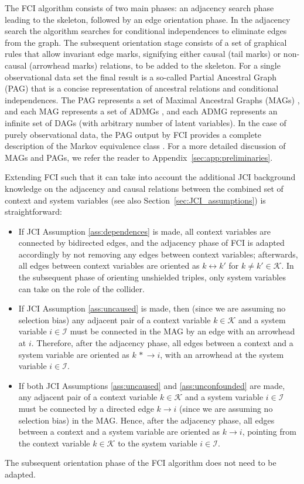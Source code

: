 \documentclass[twoside,11pt]{article}
\newcommand\C[1]{\mathcal{#1}}
\newcommand{\oto}{\leftrightarrow}
\begin{document}
The FCI algorithm consists of two main phases: an adjacency search phase leading to the skeleton, followed by an edge orientation phase. In the adjacency search the algorithm searches for conditional independences to eliminate edges from the graph. The subsequent orientation stage consists of a set of graphical rules that allow invariant edge marks, signifying either causal (tail marks) or non-causal (arrowhead marks) relations, to be added to the skeleton. For a single observational data set the final result is a so-called Partial Ancestral Graph (PAG) that is a concise representation of ancestral relations and conditional independences. The PAG represents a set of Maximal Ancestral Graphs (MAGs) \citep{RichardsonSpirtes02}, and each MAG represents a set of ADMGs \citep{triantafillou2015constraint}, and each ADMG represents an infinite set of DAGs (with arbitrary number of latent variables). In the case of purely observational data, the PAG output by FCI provides a complete description of the Markov equivalence class \citep{Zhang2008_AI}. For a more detailed discussion of MAGs and PAGs, we refer the reader to Appendix~\ref{sec:app:preliminaries}.

Extending FCI such that it can take into account the additional JCI background knowledge on the adjacency and causal relations between the combined set of context and system variables (see also Section~\ref{sec:JCI_assumptions}) is straightforward:
\begin{itemize}
\item
If JCI Assumption \ref{ass:dependences} is made, all context variables are connected by bidirected edges, and the adjacency phase of FCI is adapted accordingly by not removing any edges between context variables; afterwards, all edges between context variables are oriented as $k \oto k'$ for $k \ne k' \in \C{K}$. In the subsequent phase of orienting unshielded triples, only system variables can take on the role of the collider. 
\item
If JCI Assumption \ref{ass:uncaused} is made, then (since we are assuming no selection bias) any adjacent pair of a context variable $k\in\C{K}$ and a system variable $i\in\C{I}$ must be connected in the MAG by an edge with an arrowhead at $i$. Therefore, after the adjacency phase, all edges between a context and a system variable are oriented as $k \, \ast \!\!\! \rightarrow i$, with an arrowhead at the system variable $i \in \C{I}$.
\item
If both JCI Assumptions \ref{ass:uncaused} and \ref{ass:unconfounded} are made, any adjacent pair of a context variable $k\in\C{K}$ and a system variable $i\in\C{I}$ must be connected by a directed edge $k\to i$ (since we are assuming no selection bias) in the MAG. Hence, after the adjacency phase, all edges between a context and a system variable are oriented as $k \to i$, pointing from the context variable $k \in \C{K}$ to the system variable $i \in \C{I}$.
\end{itemize}
The subsequent orientation phase of the FCI algorithm does not need to be adapted. 
\end{document}
